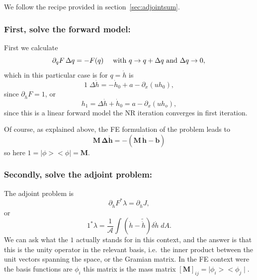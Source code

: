 \documentclass[10pt,a4paper]{book}
\newcommand{\p}{\partial}
\begin{document}
We follow the recipe provided in section~\ref{sec:adjointsum}.

\subsubsection{First, solve the forward model:}
First we calculate
\[
\p_q F \, \Delta q  = -F(q) \quad \text{ with } q \to q +\Delta q \text{ and } \Delta q \to 0,  \\
\]
which in this particular case is for $q=\dot{h}$ is
\[
 1 \; \Delta \dot{h} = - \dot{h}_0 + a - \p_x (u h_0),
\]
since $\p_{\dot{h}} F = 1 $, or
\[
 h_1 = \Delta \dot{h} + \dot{h}_0 = a - \p_x (u h_o),
\]
since this is a linear forward model the NR iteration converges in first iteration.

Of course, as explained above, the FE formulation of the problem leads to
\[
\bm{M} \, \bm{ \Delta \dot{h}} = - ( \bm{M} \, \bm{\dot{h}} - \bm{b}) 
\]
so here $1=|\phi><\phi|=\bm{M}$.
\subsubsection{Secondly, solve the adjoint problem:}
The adjoint problem is
\[
\p_{\dot{h}} F^{*} \lambda  = \p_{\dot{h}} J ,
\]
or
\[
1^{*} \lambda = \frac{1}{\mathcal{A}} \int \left (\dot{h}-\tilde{\dot{h}} \right ) \delta \dot{h} \; dA.
\]
We can ask what the $1$ actually stands for in this context, and the
answer is that this is the unity operator in the relevant basis,
i.e.\ the inner product between the unit vectors spanning the space,
or the Gramian matrix. In the FE context were the basis functions are
$\phi_i$ this matrix is the mass matrix $[\bm{M}]_{ij}= \mid \phi_i  >< \phi_j \mid $.
\end{document}
